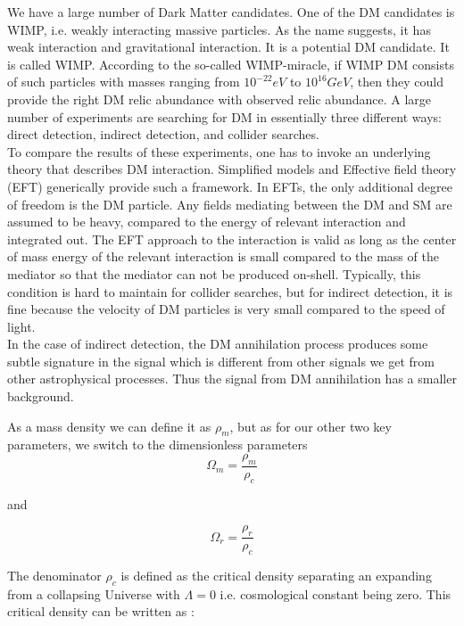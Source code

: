 \documentclass[12pt]{report}
\begin{document}
We have a large number of Dark Matter candidates. One of the DM candidates is WIMP, i.e. weakly interacting massive particles. As the name suggests, it has weak interaction and gravitational interaction. It is a potential DM candidate. It is called WIMP. According to the so-called WIMP-miracle, if WIMP DM consists of such particles with masses ranging from $10^{-22}eV$ to $10^{16} GeV$, then they could provide the right DM relic abundance with observed relic abundance. A large number of experiments are searching for DM in essentially three different ways: direct detection, indirect detection, and collider searches.\\

To compare the results of these experiments, one has to invoke an underlying theory that describes DM interaction. Simplified models and Effective field theory (EFT) generically provide such a framework. In EFTs, the only additional degree of freedom is the DM particle. Any fields mediating between the DM and SM are assumed to be heavy, compared to the energy of relevant interaction and integrated out. The EFT approach to the interaction is valid as long as the center of mass energy of the relevant interaction is small compared to the mass of the mediator so that the mediator can not be produced on-shell. Typically, this condition is hard to maintain for collider searches, but for indirect detection, it is fine because the velocity of DM particles is very small compared to the speed of light.\\


In the case of indirect detection, the DM annihilation process produces some subtle signature in the signal which is different from other signals we get from other astrophysical processes. Thus the signal from DM annihilation has a smaller background.


As a mass density we can define it as $\rho_m$, but as
for our other two key parameters, we switch to the dimensionless parameters
\begin{equation}
\Omega_m = \frac{\rho_m}{\rho_c} \label{abundance}
\end{equation}

and

\begin{equation}
\Omega_r = \frac{\rho_r}{\rho_c}
\end{equation}

The denominator $\rho_c$ is defined as the critical density separating an expanding from a collapsing Universe with $\Lambda =0$ i.e. cosmological constant being zero. This critical density can be written as 
\cite{dmtheory4} :
\end{document}

